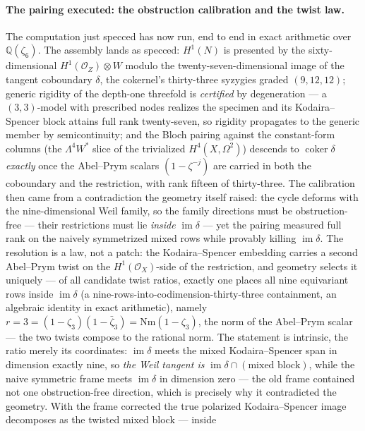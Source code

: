 \documentclass[11pt]{article}
\theoremstyle{definition}
\theoremstyle{remark}
\begin{document}
\paragraph{The pairing executed: the obstruction calibration and the twist
law.} The computation just specced has now run, end to end in exact
arithmetic over $\mathbb Q(\zeta_6)$. The assembly lands as specced:
$H^1(N)$ is presented by the sixty-dimensional $H^1(\mathcal O_Z)\otimes W$
modulo the twenty-seven-dimensional image of the tangent coboundary
$\delta$, the cokernel's thirty-three syzygies graded $(9,12,12)$; generic
rigidity of the depth-one threefold is \emph{certified} by degeneration ---
a $(3,3)$-model with prescribed nodes realizes the specimen and its
Kodaira--Spencer block attains full rank twenty-seven, so rigidity
propagates to the generic member by semicontinuity; and the Bloch pairing
against the constant-form columns (the $\Lambda^4W^*$ slice of the
trivialized $H^4(X,\Omega^2)$) descends to $\operatorname{coker}\delta$
\emph{exactly} once the Abel--Prym scalars $(1-\zeta^{-j})$ are carried in
both the coboundary and the restriction, with rank fifteen of thirty-three.
The calibration then came from a contradiction the geometry itself raised:
the cycle deforms with the nine-dimensional Weil family, so the family
directions must be obstruction-free --- their restrictions must lie
\emph{inside} $\operatorname{im}\delta$ --- yet the pairing measured full
rank on the naively symmetrized mixed rows while provably killing
$\operatorname{im}\delta$. The resolution is a law, not a patch: the
Kodaira--Spencer embedding carries a second Abel--Prym twist on the
$H^1(\mathcal O_X)$-side of the restriction, and geometry selects it
uniquely --- of all candidate twist ratios, exactly one places all nine
equivariant rows inside $\operatorname{im}\delta$ (a
nine-rows-into-codimension-thirty-three containment, an algebraic identity
in exact arithmetic), namely $r=3=(1-\zeta_3)(1-\bar\zeta_3)
=\mathrm{Nm}(1-\zeta_3)$, the norm of the Abel--Prym scalar --- the two
twists compose to the rational norm. The statement is intrinsic, the ratio
merely its coordinates: $\operatorname{im}\delta$ meets the mixed
Kodaira--Spencer span in dimension exactly nine, so \emph{the Weil tangent
is} $\operatorname{im}\delta\cap(\text{mixed block})$, while the naive
symmetric frame meets $\operatorname{im}\delta$ in dimension zero --- the
old frame contained not one obstruction-free direction, which is precisely
why it contradicted the geometry. With the frame corrected the true polarized Kodaira--Spencer image
decomposes as the twisted mixed block --- inside
\end{document}
